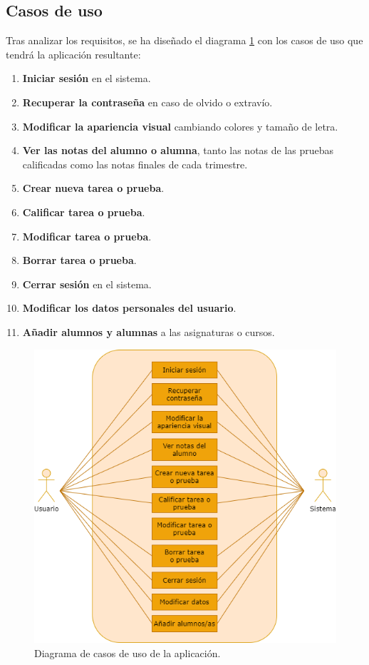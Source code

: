 \subsection{Casos de uso}
Tras analizar los requisitos, se ha diseñado el diagrama \ref{Fig:diagramacdu} con los casos de uso que tendrá la aplicación resultante:
\begin{enumerate}
	\item \textbf{Iniciar sesión} en el sistema.
	\item \textbf{Recuperar la contraseña} en caso de olvido o extravío.
	\item \textbf{Modificar la apariencia visual} cambiando colores y tamaño de letra.
	\item \textbf{Ver las notas del alumno o alumna}, tanto las notas de las pruebas calificadas como las notas finales de cada trimestre.
	\item \textbf{Crear nueva tarea o prueba}.
	\item \textbf{Calificar tarea o prueba}.
	\item \textbf{Modificar tarea o prueba}.
	\item \textbf{Borrar tarea o prueba}.
	\item \textbf{Cerrar sesión} en el sistema.
	\item \textbf{Modificar los datos personales del usuario}.
	\item \textbf{Añadir alumnos y alumnas} a las asignaturas o cursos.
\end{enumerate}

\begin{figure}[H]
\centering\includegraphics[width=0.75\linewidth]{figs/diagramacdu.png}
\caption{Diagrama de casos de uso de la aplicación.}
\label{Fig:diagramacdu}
\end{figure}

